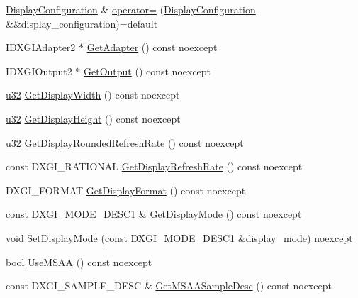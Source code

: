 \begin{DoxyCompactItemize}
\hyperlink{structmage_1_1_display_configuration}{Display\+Configuration} \& \hyperlink{structmage_1_1_display_configuration_a56c175220b8f597afd7d5d6275b5d0de}{operator=} (\hyperlink{structmage_1_1_display_configuration}{Display\+Configuration} \&\&display\+\_\+configuration)=default
\item 
I\+D\+X\+G\+I\+Adapter2 $\ast$ \hyperlink{structmage_1_1_display_configuration_a415acc2cba9d5f28dc42073bb69fbac2}{Get\+Adapter} () const noexcept
\item 
I\+D\+X\+G\+I\+Output2 $\ast$ \hyperlink{structmage_1_1_display_configuration_aa328570fbfc6456c0e5d90e738aec81b}{Get\+Output} () const noexcept
\item 
\hyperlink{namespacemage_af2b398bf98eb10351f49cad73fe2cc73}{u32} \hyperlink{structmage_1_1_display_configuration_aa4a4e922d783b3211f75e34fbfd324b9}{Get\+Display\+Width} () const noexcept
\item 
\hyperlink{namespacemage_af2b398bf98eb10351f49cad73fe2cc73}{u32} \hyperlink{structmage_1_1_display_configuration_a8a3378659c6da249668416951fff87fe}{Get\+Display\+Height} () const noexcept
\item 
\hyperlink{namespacemage_af2b398bf98eb10351f49cad73fe2cc73}{u32} \hyperlink{structmage_1_1_display_configuration_ae390ed9fb1f00d00ac2b9bf145a3b912}{Get\+Display\+Rounded\+Refresh\+Rate} () const noexcept
\item 
const D\+X\+G\+I\+\_\+\+R\+A\+T\+I\+O\+N\+AL \hyperlink{structmage_1_1_display_configuration_aa92237613f8077d189f9504fec371cb8}{Get\+Display\+Refresh\+Rate} () const noexcept
\item 
D\+X\+G\+I\+\_\+\+F\+O\+R\+M\+AT \hyperlink{structmage_1_1_display_configuration_a412215b18edac3ec6bf18cd00d8c689b}{Get\+Display\+Format} () const noexcept
\item 
const D\+X\+G\+I\+\_\+\+M\+O\+D\+E\+\_\+\+D\+E\+S\+C1 \& \hyperlink{structmage_1_1_display_configuration_a20270be6a17deab929fce25596edabd4}{Get\+Display\+Mode} () const noexcept
\item 
void \hyperlink{structmage_1_1_display_configuration_a23401fc0c20d52d44480c32fc6020e85}{Set\+Display\+Mode} (const D\+X\+G\+I\+\_\+\+M\+O\+D\+E\+\_\+\+D\+E\+S\+C1 \&display\+\_\+mode) noexcept
\item 
bool \hyperlink{structmage_1_1_display_configuration_a7bf7445c7242fc8d943b04d1975cfa72}{Use\+M\+S\+AA} () const noexcept
\item 
const D\+X\+G\+I\+\_\+\+S\+A\+M\+P\+L\+E\+\_\+\+D\+E\+SC \& \hyperlink{structmage_1_1_display_configuration_a254a0752dd6d1ec68121cd6495a10a02}{Get\+M\+S\+A\+A\+Sample\+Desc} () const noexcept

\end{DoxyCompactItemize}
